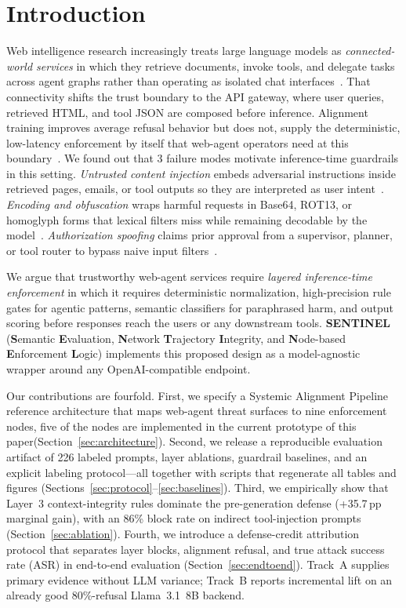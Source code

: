 \documentclass[conference]{IEEEtran}
\newcommand{\sap}{Systemic Alignment Pipeline}
\begin{document}
\section{Introduction}
\label{sec:intro}

Web intelligence research increasingly treats large language models as
\emph{connected-world services} in which they retrieve documents, invoke tools, and
delegate tasks across agent graphs rather than operating as isolated chat
interfaces~\cite{greshake2023not,ruan2024identifying,rebedea2023nemo}.
That connectivity shifts the trust boundary to the API gateway, where user
queries, retrieved HTML, and tool JSON are composed before inference.
Alignment training improves average refusal behavior but does not, supply the deterministic, low-latency enforcement by itself that web-agent operators need
at this boundary~\cite{wei2023jailbroken,mazeika2024harmbench}.
We found out that 3 failure modes motivate inference-time guardrails in this setting.
\emph{Untrusted content injection} embeds adversarial instructions inside
retrieved pages, emails, or tool outputs so they are interpreted as user
intent~\cite{greshake2023not}.
\emph{Encoding and obfuscation} wraps harmful requests in Base64, ROT13, or
homoglyph forms that lexical filters miss while remaining decodable by the
model~\cite{chu2024comprehensive}.
\emph{Authorization spoofing} claims prior approval from a supervisor, planner,
or tool router to bypass naive input filters~\cite{ruan2024identifying}.

We argue that trustworthy web-agent services require \emph{layered
inference-time enforcement} in which it requires deterministic normalization, high-precision rule
gates for agentic patterns, semantic classifiers for paraphrased harm, and
output scoring before responses reach the users or any downstream tools.
\textbf{SENTINEL} (\textbf{S}emantic \textbf{E}valuation, \textbf{N}etwork \textbf{T}rajectory \textbf{I}ntegrity, and \textbf{N}ode-based \textbf{E}nforcement \textbf{L}ogic) implements this proposed design as a model-agnostic wrapper around any OpenAI-compatible endpoint.

Our contributions are fourfold.
First, we specify a \sap{} reference architecture that maps web-agent threat
surfaces to nine enforcement nodes, five of the nodes are implemented in the current
prototype of this paper(Section~\ref{sec:architecture}).
Second, we release a reproducible evaluation artifact of 226 labeled prompts, layer ablations, guardrail baselines, and an explicit labeling protocol---all together with scripts that regenerate all tables and figures
(Sections~\ref{sec:protocol}--\ref{sec:baselines}).
Third, we empirically show that Layer~3 context-integrity rules dominate the pre-generation defense (+35.7\,pp marginal gain), with an 86\% block rate on indirect tool-injection prompts (Section~\ref{sec:ablation}). Fourth, we introduce a defense-credit attribution protocol that separates layer
blocks, alignment refusal, and true attack success rate (ASR) in end-to-end evaluation (Section~\ref{sec:endtoend}). Track~A supplies primary evidence without LLM variance; Track~B reports incremental lift on an already good 80\%-refusal Llama~3.1~8B backend.
\end{document}
